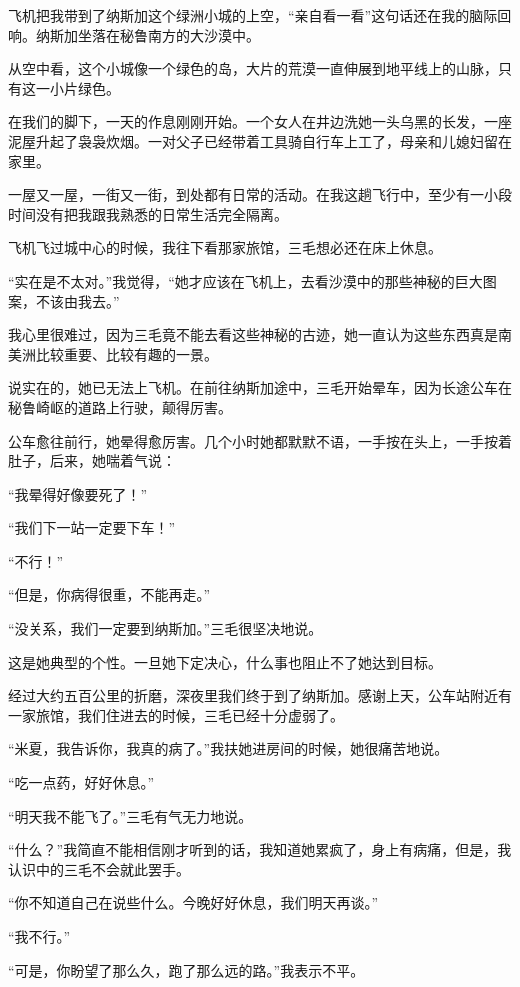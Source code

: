 \par 飞机把我带到了纳斯加这个绿洲小城的上空，“亲自看一看”这句话还在我的脑际回响。纳斯加坐落在秘鲁南方的大沙漠中。
\par 从空中看，这个小城像一个绿色的岛，大片的荒漠一直伸展到地平线上的山脉，只有这一小片绿色。
\par 在我们的脚下，一天的作息刚刚开始。一个女人在井边洗她一头乌黑的长发，一座泥屋升起了袅袅炊烟。一对父子已经带着工具骑自行车上工了，母亲和儿媳妇留在家里。
\par 一屋又一屋，一街又一街，到处都有日常的活动。在我这趟飞行中，至少有一小段时间没有把我跟我熟悉的日常生活完全隔离。
\par 飞机飞过城中心的时候，我往下看那家旅馆，三毛想必还在床上休息。
\par “实在是不太对。”我觉得，“她才应该在飞机上，去看沙漠中的那些神秘的巨大图案，不该由我去。”
\par 我心里很难过，因为三毛竟不能去看这些神秘的古迹，她一直认为这些东西真是南美洲比较重要、比较有趣的一景。
\par 说实在的，她已无法上飞机。在前往纳斯加途中，三毛开始晕车，因为长途公车在秘鲁崎岖的道路上行驶，颠得厉害。
\par 公车愈往前行，她晕得愈厉害。几个小时她都默默不语，一手按在头上，一手按着肚子，后来，她喘着气说：
\par “我晕得好像要死了！”
\par “我们下一站一定要下车！”
\par “不行！”
\par “但是，你病得很重，不能再走。”
\par “没关系，我们一定要到纳斯加。”三毛很坚决地说。
\par 这是她典型的个性。一旦她下定决心，什么事也阻止不了她达到目标。
\par 经过大约五百公里的折磨，深夜里我们终于到了纳斯加。感谢上天，公车站附近有一家旅馆，我们住进去的时候，三毛已经十分虚弱了。
\par “米夏，我告诉你，我真的病了。”我扶她进房间的时候，她很痛苦地说。
\par “吃一点药，好好休息。”
\par “明天我不能飞了。”三毛有气无力地说。
\par “什么？”我简直不能相信刚才听到的话，我知道她累疯了，身上有病痛，但是，我认识中的三毛不会就此罢手。
\par “你不知道自己在说些什么。今晚好好休息，我们明天再谈。”
\par “我不行。”
\par “可是，你盼望了那么久，跑了那么远的路。”我表示不平。
